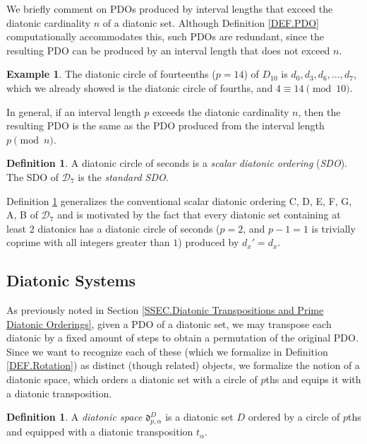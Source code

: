 \documentclass{article}
\theoremstyle{plain}
\theoremstyle{definition}
\newtheorem{definition}[theorem]{Definition}
\newtheorem{example}[theorem]{Example}
\theoremstyle{remark}
\begin{document}
We briefly comment on PDOs produced by interval lengths that exceed the diatonic cardinality $n$ of a diatonic set. Although Definition \ref{DEF.PDO} computationally accommodates this, such PDOs are redundant, since the resulting PDO can be produced by an interval length that does not exceed $n$.

\begin{example}
	The diatonic circle of fourteenths ($p=14$) of $D_{10}$ is $d_0,d_3,d_6,\dots,d_7$, which we already showed is the diatonic circle of fourths, and $4\equiv 14\pmod{10}$.
\end{example}

In general, if an interval length $p$ exceeds the diatonic cardinality $n$, then the resulting PDO is the same as the PDO produced from the interval length $p\pmod{n}$.

\begin{definition}
\label{DEF.SDO}
	A diatonic circle of seconds is a \textit{scalar diatonic ordering} (\textit{SDO}). The SDO of $\mathcal{D}_7$ is the \textit{standard SDO}.
\end{definition}

Definition \ref{DEF.SDO} generalizes the conventional scalar diatonic ordering C, D, E, F, G, A, B of $\mathcal{D}_7$ and is motivated by the fact that every diatonic set containing at least $2$ diatonics has a diatonic circle of seconds ($p=2$, and $p-1=1$ is trivially coprime with all integers greater than $1$) produced by $d_x'=d_x$.

\subsection{Diatonic Systems}
\label{SSEC.Diatonic Systems}

As previously noted in Section \ref{SSEC.Diatonic Transpositions and Prime Diatonic Orderings}, given a PDO of a diatonic set, we may transpose each diatonic by a fixed amount of steps to obtain a permutation of the original PDO. Since we want to recognize each of these  (which we formalize in Definition \ref{DEF.Rotation}) as distinct (though related) objects, we formalize the notion of a diatonic space, which orders a diatonic set with a circle of $p$ths and equips it with a diatonic transposition.

\begin{definition}
\label{DEF.Diatonic Space}
	A \textit{diatonic space} $\mathfrak{d}_{p,\alpha}^D$ is a diatonic set $D$ ordered by a circle of $p$ths and equipped with a diatonic transposition $t_\alpha$.
\end{definition}
\end{document}
